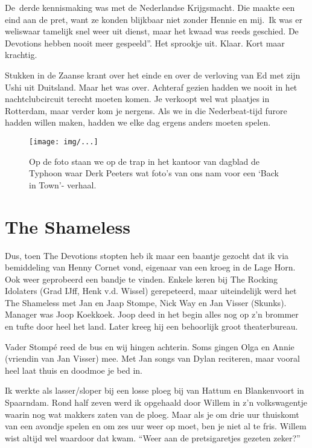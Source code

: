 \documentclass[10pt,twoside,openright]{memoir}
\begin{document}
De derde kennismaking was met de Nederlandse Krijgsmacht. Die maakte een eind aan de pret, want ze konden blijkbaar niet zonder Hennie en mij. Ik was er weliswaar tamelijk snel weer uit dienst, maar het kwaad was reeds geschied. De Devotions hebben nooit meer gespeeld”. Het sprookje uit. Klaar. Kort maar krachtig.

Stukken in de Zaanse krant over het einde en over de verloving van Ed met zijn Ushi uit Duitsland. Maar het was over. 	
Achteraf gezien hadden we nooit in het nachtclubcircuit terecht moeten komen. Je verkoopt wel wat plaatjes in Rotterdam, maar verder kom je nergens. Als we in die Nederbeat-tijd furore hadden willen maken, hadden we elke dag ergens anders moeten spelen.

\begin{figure}[t]
\texttt{[image: img/...]}
\caption{Op de foto staan we op de trap in het kantoor van dagblad de Typhoon waar Derk Peeters wat foto’s van ons nam voor een ‘Back in Town’- verhaal. }
\end{figure}

\chapter{The Shameless} %
\label{cha:shameless}

Dus, toen The Devotions stopten heb ik maar een baantje gezocht dat ik via bemiddeling van Henny Cornet vond, eigenaar van een kroeg in de Lage Horn. Ook weer geprobeerd een bandje te vinden. Enkele keren bij The Rocking Idolaters (Grad IJff, Henk v.d. Wissel) gerepeteerd, maar uiteindelijk werd het The Shameless met Jan en Jaap Stompe, Nick Way en Jan Visser (Skunks). Manager was Joop Koekkoek. Joop deed in het begin alles nog op z’n brommer en tufte door heel het land. Later kreeg hij een behoorlijk groot theaterbureau. 

Vader Stompé reed de bus en wij hingen achterin. Soms gingen Olga en Annie (vriendin van Jan Visser) mee. Met Jan songs van Dylan reciteren, maar vooral heel laat thuis en doodmoe je bed in.

Ik werkte als lasser/sloper bij een losse ploeg bij van Hattum en Blankenvoort in Spaarndam. Rond half zeven werd ik opgehaald door Willem in z’n volkswagentje waarin nog wat makkers zaten van de ploeg. Maar als je om drie uur thuiskomt van een avondje spelen en om zes uur weer op moet, ben je niet al te fris. Willem wist altijd wel waardoor dat kwam. “Weer aan de pretsigaretjes gezeten zeker?”
\end{document}

